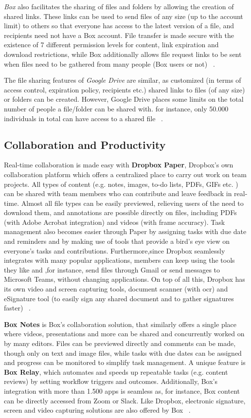 \textit{Box} also facilitates the sharing of files and folders by allowing the creation of shared links. These links can be used to send files of any size (up to the account limit) to others so that everyone has access to the latest version of a file, and recipients need not have a Box account. File transfer is made secure with the existence of 7 different permission levels for content, link expiration and download restrictions, while Box additionally allows file request links to be sent when files need to be gathered from many people (Box users or not) ~\cite{box}.

The file sharing features of \textit{Google Drive} are similar, as customized (in terms of access control, expiration policy, recipients etc.) shared links to files (of any size) or folders can be created. However, Google Drive places some limits on the total number of people a file/folder can be shared with. for instance, only 50.000 individuals in total can have access to a shared file ~\cite{google_drive,drive_sharing_limits}.

\subsection{Collaboration and Productivity}
Real-time collaboration is made easy with \textbf{Dropbox Paper}, Dropbox's own collaboration platform which offers a centralized place to carry out work on team projects. All types of content (e.g. notes, images, to-do lists, PDFs, GIFs etc. ) can be shared with team members who can contribute and leave feedback in real-time. Almost all file types can be easily previewed, relieving users of the need to download them, and annotations are possible directly on files, including PDFs (with Adobe Acrobat integration) and videos (with frame accuracy). Task management also becomes easier through Paper by assigning tasks with due date and reminders and by making use of tools that provide a bird's eye view on everyone's tasks and contributions. Furthermore,since Dropbox seamlessly integrates with many popular applications, members can keep using the tools they like and ,for instance, send files through Gmail or send messages to Microsoft Teams, without changing applications. On top of all this, Dropbox has its own video and screen capturing tools, document scanner (with \ac{ocr}) and eSignature tool (to easily sign any shared document and to gather signatures faster) ~\cite{dropbox,dropbox_requests}.

\textbf{Box Notes} is Box's collaboration solution, that similarly offers a single place where videos, presentations and more can be shared and concurrently worked on by many editors. Files can be previewed directly and comments can be made, though only on text and image files, while tasks with due dates can be assigned and progress can be monitored to simplify task management. A unique feature is \textbf{Box Relay}, which automates and speeds up repeatable tasks (e.g. content reviews) by setting workflow triggers and outcomes. Additionally, Box's integration with more than 1.500 apps is seamless as, for instance, Box content can be directly accessed from Zoom or Slack. Like Dropbox, electronic signature, screen and video capturing solutions are also offered by Box ~\cite{box,box_annotations}.

